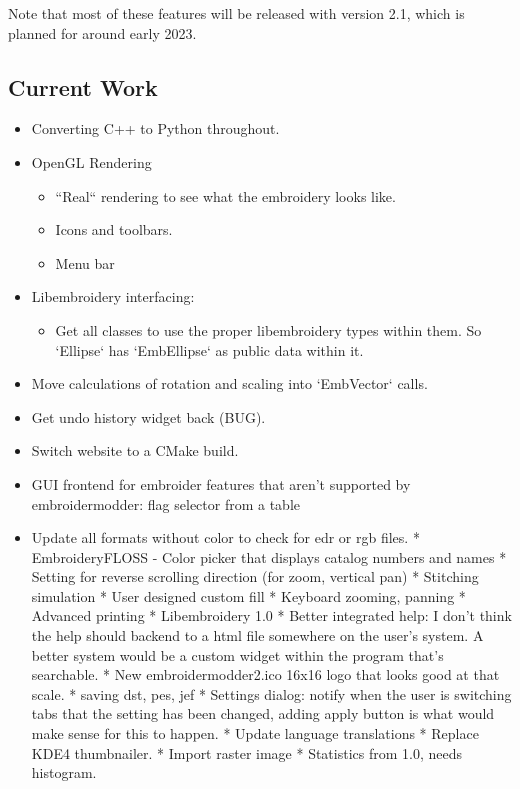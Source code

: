 \documentclass[11pt]{report}
\begin{document}
Note that most of these features will be released with version 2.1, which is planned for around early 2023.

\subsection{Current Work}

\begin{itemize}
\item Converting C++ to Python throughout.
\item OpenGL Rendering
\begin{itemize}
  \item ``Real`` rendering to see what the embroidery looks like.
  \item Icons and toolbars.
  \item Menu bar
\end{itemize}
\item Libembroidery interfacing:
\begin{itemize}
  \item Get all classes to use the proper libembroidery types within them. So `Ellipse` has `EmbEllipse` as public data within it.
\end{itemize}
\item Move calculations of rotation and scaling into `EmbVector` calls.
\item Get undo history widget back (BUG).
\item Switch website to a CMake build.
\item GUI frontend for embroider features that aren't supported by embroidermodder: flag selector from a table
\item Update all formats without color to check for edr or rgb files.
* EmbroideryFLOSS - Color picker that displays catalog numbers and names
* Setting for reverse scrolling direction (for zoom, vertical pan)
* Stitching simulation
* User designed custom fill
* Keyboard zooming, panning
* Advanced printing
* Libembroidery 1.0
* Better integrated help: I don't think the help should backend to a html file somewhere on the user's system. A better system would be a custom widget within the program that's searchable.
* New embroidermodder2.ico 16x16 logo that looks good at that scale.
* saving dst, pes, jef
* Settings dialog: notify when the user is switching tabs that the setting has been changed, adding apply button is what would make sense for this to happen.
* Update language translations
* Replace KDE4 thumbnailer.
* Import raster image
* Statistics from 1.0, needs histogram.

\end{itemize}
\end{document}
